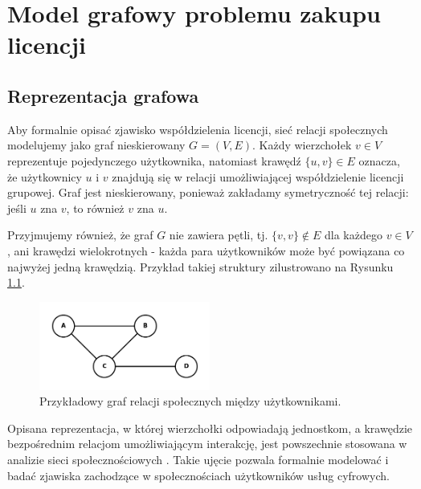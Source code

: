 \chapter{Model grafowy problemu zakupu licencji}

\section{Reprezentacja grafowa}

Aby formalnie opisać zjawisko współdzielenia licencji, sieć relacji społecznych modelujemy jako graf nieskierowany \( G = (V, E) \). Każdy wierzchołek \( v \in V \) reprezentuje pojedynczego użytkownika, natomiast krawędź \( \{u, v\} \in E \) oznacza, że użytkownicy \( u \) i \( v \) znajdują się w relacji umożliwiającej współdzielenie licencji grupowej. Graf jest nieskierowany, ponieważ zakładamy symetryczność tej relacji: jeśli \( u \) zna \( v \), to również \( v \) zna \( u \).

Przyjmujemy również, że graf \( G \) nie zawiera pętli, tj. \( \{v, v\} \notin E \) dla każdego \( v \in V \), ani krawędzi wielokrotnych - każda para użytkowników może być powiązana co najwyżej jedną krawędzią. Przykład takiej struktury zilustrowano na Rysunku \ref{fig:social_graph}.

\begin{figure}[H]
    \centering
    \includegraphics[width=0.5\textwidth]{assets/graphmodelexample.png}
    \caption{Przykładowy graf relacji społecznych między użytkownikami.}
    \label{fig:social_graph}
\end{figure}

Opisana reprezentacja, w której wierzchołki odpowiadają jednostkom, a krawędzie bezpośrednim relacjom umożliwiającym interakcję, jest powszechnie stosowana w analizie sieci społecznościowych \cite{Brandes2004, NETTLETON20131}. Takie ujęcie pozwala formalnie modelować i badać zjawiska zachodzące w społecznościach użytkowników usług cyfrowych.

